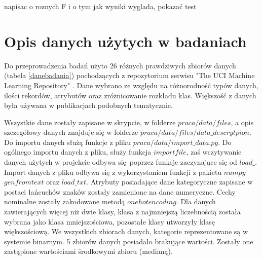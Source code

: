  napisac o roznych F i o tym jak wyniki wyglada, pokazać test

\section{Opis danych użytych w badaniach}
Do przeprowadzenia badań użyto 26 różnych prawdziwych zbiorów danych (tabela \ref{danebadania}) pochodzących z repozytorium serwisu "The UCI Machine Learning Repository" \cite{uci}. Dane wybrano ze względu na różnorodność typów danych, ilości rekordów, atrybutów oraz zróżnicowanie rozkładu klas. Większość z danych była używana w publikacjach podobnych tematycznie\cite{hyper}\cite{StefImbalanced}. \par
Wszystkie dane zostały zapisane w skrypcie, w folderze $praca/data/files$, a opis szczegółowy danych znajduje się w folderze $praca/data/files/data\_descrytpion$. Do importu danych służą funkcje z pliku $praca/data/import\_data.py$. Do ogólnego importu danych z pliku, służy funkcja $importfile$, zaś wczytywanie danych użytych w projekcie odbywa się poprzez funkcje zaczynające się od $load\_$. Import danych z pliku odbywa się z wykorzystaniem funkcji z pakietu $numpy$ $genfromtext$ oraz $load\_txt$. Atrybuty posiadające dane kategoryczne zapisane w postaci łańcuchów znaków zostały zamienione na dane numeryczne. Cechy nominalne zostały zakodowane metodą $one hot encoding$. Dla danych zawierających więcej niż dwie klasy, klasa z najmniejszą liczebnością została wybrana jako klasa mniejszościowa, pozostałe klasy utworzyły klasę większościową. We wszystkich zbiorach danych, kategorie reprezentowane są w systemie binarnym. 5 zbiorów danych posiadało brakujące wartości. Zostały one zastąpione wartościami środkowymi zbioru (medianą).
